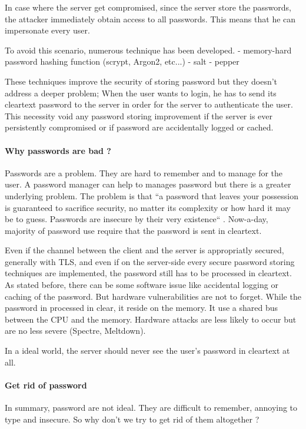\documentclass[../report.tex]{subfiles}
\begin{document}
In case where the server get compromised, since the server store the passwords, the attacker immediately obtain access to all passwords. This means that he can impersonate every user.

To avoid this scenario, numerous technique has been developed.
- memory-hard password hashing function (scrypt, Argon2, etc...)
- salt
- pepper

These techniques improve the security of storing password but they doesn't address a deeper problem;
When the user wants to login, he has to send its cleartext password to the server in order for the server to authenticate the user. This necessity void any password storing improvement if the server is ever persistently compromised or if password are accidentally logged or cached.


\paragraph{Why passwords are bad ?}
Passwords are a problem. They are hard to remember and to manage for the user. A password manager can help to manages password but there is a greater underlying problem.
The problem is that ``a password that leaves your possession is guaranteed to sacrifice security, no matter its complexity or how hard it may be to guess. Passwords are insecure by their very existence`` \cite{PAKE_Cloudflare_blog}. %
Now-a-day, majority of password use require that the password is sent in cleartext.

Even if the channel between the client and the server is appropriatly secured, generally with TLS, and even if on the server-side every secure password storing techniques are implemented, the password still has to be processed in cleartext.
As stated before, there can be some software issue like accidental logging or caching of the password. But hardware vulnerabilities are not to forget. While the password in processed in clear, it reside on the memory. It use a shared bus between the CPU and the memory. Hardware attacks are less likely to occur but are no less severe (Spectre, Meltdown).

In a ideal world, the server should never see the user's password in cleartext at all.


\paragraph{Get rid of password}

In summary, password are not ideal. They are difficult to remember, annoying to type and insecure.
So why don't we try to get rid of them altogether ?
\end{document}
